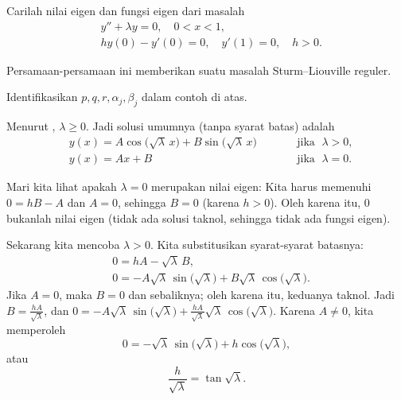 \begin{example}
Carilah nilai eigen dan fungsi eigen dari masalah
\begin{align*}
& y''+\lambda y = 0, \quad 0 < x < 1 , \\
& hy(0)- y'(0) = 0, \quad y'(1)  = 0, \quad h > 0.
\end{align*}

Persamaan-persamaan ini memberikan suatu masalah Sturm--Liouville reguler.

\begin{exercise}
Identifikasikan $p, q, r, \alpha_j, \beta_j$ dalam contoh di atas.
\end{exercise}

Menurut ,
$\lambda \geq 0$.
Jadi solusi umumnya (tanpa syarat batas) adalah
\begin{equation*}
\begin{aligned}
 & y(x) = A \cos \bigl( \sqrt{\lambda}\, x\bigr)
+ B \sin \bigl( \sqrt{\lambda}\, x\bigr) & & \qquad \text{jika } \; \lambda > 0 , \\
& y(x) = A x + B & & \qquad \text{jika } \; \lambda = 0 .
\end{aligned}
\end{equation*}

Mari kita lihat apakah $\lambda = 0$ merupakan nilai eigen:
Kita harus memenuhi $0 = hB - A$ dan $A = 0$, sehingga $B=0$ (karena $h > 0$).
Oleh karena itu, 0 bukanlah nilai eigen (tidak ada solusi taknol, sehingga tidak ada fungsi eigen).

Sekarang kita
mencoba $\lambda > 0$.  Kita substitusikan syarat-syarat batasnya:
\begin{align*}
& 0 = h A - \sqrt{\lambda}\, B , \\
& 0 = -A \sqrt{\lambda}\, \sin \bigl(\sqrt{\lambda}\bigr)
+ B \sqrt{\lambda}\, \cos \bigl(\sqrt{\lambda}\bigr) .
\end{align*}
Jika $A=0$, maka $B=0$ dan sebaliknya; oleh karena itu, keduanya taknol.
Jadi $B = \frac{hA}{\sqrt{\lambda}}$, dan
$0 = -A \sqrt{\lambda}\, \sin \bigl( \sqrt{\lambda}\bigr) + \frac{hA}{\sqrt{\lambda}}
\sqrt{\lambda}\, \cos \bigl( \sqrt{\lambda}\bigr)$.  Karena $A \neq 0$, kita memperoleh
\begin{equation*}
0 = 
- \sqrt{\lambda}\, \sin \bigl( \sqrt{\lambda}\bigr)
+ h \cos \bigl( \sqrt{\lambda}\bigr) ,
\end{equation*}
atau
\begin{equation*}
\frac{h}{\sqrt{\lambda}} = \tan \sqrt{\lambda} .
\end{equation*}


\end{example}

